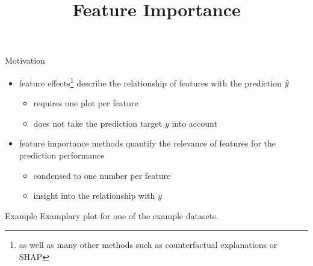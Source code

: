 \documentclass[11pt,compress,t,notes=noshow, xcolor=table]{beamer}
\title{Feature Importance}
\institute{\href{https://compstat-lmu.github.io/lecture_i2ml/}{compstat-lmu.github.io/lecture\_i2ml}}
\date{}
\begin{document}
	
	
	
	
	
	
	
	
	
	

\begin{vbframe}{Motivation}
\begin{itemize}
  \item feature effects\footnote{as well as many other methods such as counterfactual explanations or SHAP} describe the relationship of features with the prediction $\yh$
  \begin{itemize}
    \item requires one plot per feature
    \item does not take the prediction target $y$ into account
  \end{itemize}
  \item feature importance methods quantify the relevance of features for the prediction performance
  \begin{itemize}
    \item condensed to one number per feature
    \item insight into the relationship with $y$
  \end{itemize}
\end{itemize}
\end{vbframe}


\begin{vbframe}{Example}
  Examplary plot for one of the example datasets.
\end{vbframe}
\end{document}
